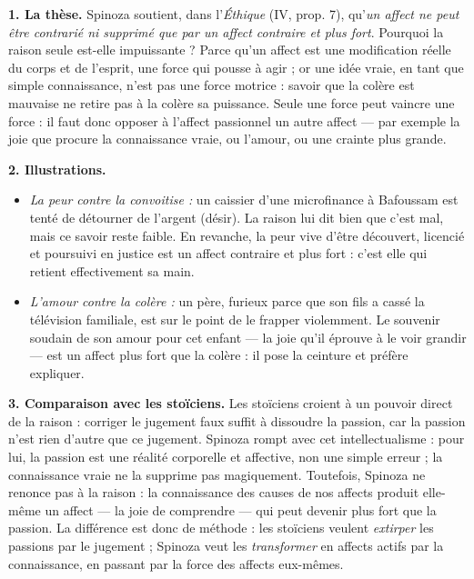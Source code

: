 \documentclass[11pt]{article}
\begin{document}
\begin{corrige}

\textbf{1. La thèse.} Spinoza soutient, dans l'\emph{Éthique} (IV, prop. 7), qu'\emph{un affect ne peut être contrarié ni supprimé que par un affect contraire et plus fort}. Pourquoi la raison seule est-elle impuissante ? Parce qu'un affect est une modification réelle du corps et de l'esprit, une force qui pousse à agir ; or une idée vraie, en tant que simple connaissance, n'est pas une force motrice : savoir que la colère est mauvaise ne retire pas à la colère sa puissance. Seule une force peut vaincre une force : il faut donc opposer à l'affect passionnel un autre affect — par exemple la joie que procure la connaissance vraie, ou l'amour, ou une crainte plus grande.

\textbf{2. Illustrations.}
\begin{itemize}
\item \emph{La peur contre la convoitise :} un caissier d'une microfinance à Bafoussam est tenté de détourner de l'argent (désir). La raison lui dit bien que c'est mal, mais ce savoir reste faible. En revanche, la peur vive d'être découvert, licencié et poursuivi en justice est un affect contraire et plus fort : c'est elle qui retient effectivement sa main.
\item \emph{L'amour contre la colère :} un père, furieux parce que son fils a cassé la télévision familiale, est sur le point de le frapper violemment. Le souvenir soudain de son amour pour cet enfant — la joie qu'il éprouve à le voir grandir — est un affect plus fort que la colère : il pose la ceinture et préfère expliquer.
\end{itemize}

\textbf{3. Comparaison avec les stoïciens.} Les stoïciens croient à un pouvoir direct de la raison : corriger le jugement faux suffit à dissoudre la passion, car la passion n'est rien d'autre que ce jugement. Spinoza rompt avec cet intellectualisme : pour lui, la passion est une réalité corporelle et affective, non une simple erreur ; la connaissance vraie ne la supprime pas magiquement. Toutefois, Spinoza ne renonce pas à la raison : la connaissance des causes de nos affects produit elle-même un affect — la joie de comprendre — qui peut devenir plus fort que la passion. La différence est donc de méthode : les stoïciens veulent \emph{extirper} les passions par le jugement ; Spinoza veut les \emph{transformer} en affects actifs par la connaissance, en passant par la force des affects eux-mêmes.

\end{corrige}
\end{document}
